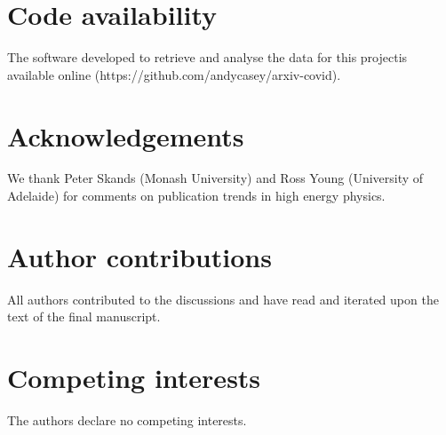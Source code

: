 \documentclass[a4paper,12pt]{article}
\begin{document}

\section*{Code availability}
The software developed to retrieve and analyse the data for this projectis available online (https://github.com/andycasey/arxiv-covid).




\section*{Acknowledgements}
We thank Peter Skands (Monash University) 
	 and Ross Young (University of Adelaide) 
for comments on publication trends in high energy physics.



\section*{Author contributions}

All authors contributed to the discussions and have read and iterated upon the text of the final manuscript. 

\section*{Competing interests}
The authors declare no competing interests. 

\end{document}

